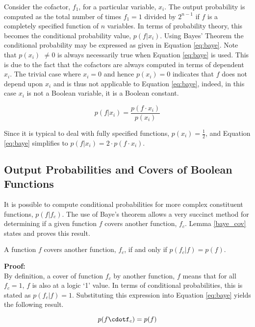 Consider the cofactor, $f_1$, for a particular variable, $x_i$.  The output probability
is computed as the total number of times $f_1 = 1$ divided by $2^{n-1}$ if $f$ is a 
completely specified function of $n$ variables.  In terms of probability theory,
this becomes the conditional probability value, $p(f | x_i)$.  Using Bayes' Theorem
the conditional probability may be expressed as given in Equation \ref{eq:baye}.
Note that $p(x_i)$ $\neq 0$ is always necessarily true when Equation \ref{eq:baye} is
used.  This is due to the fact that the cofactors are always computed in terms of dependent
$x_i$.  The trivial case where $x_i=0$ and hence $p(x_i) = 0$ indicates that $f$ does not
depend upon $x_i$ and is thus not applicable to Equation \ref{eq:baye}, indeed, in this case
$x_i$ is not a Boolean variable, it is a Boolean constant.

\begin{equation}
p(f | x_i) = \frac{p(f \cdot x_i) }{p(x_i) }   \label{eq:baye}
\end{equation}

Since it is typical to deal with fully specified functions, $p(x_i) = \frac{1}{2}$,
and Equation \ref{eq:baye} simplifies to $p(f|x_i) = 2 \cdot p(f \cdot x_i)$.

\subsection{Output Probabilities and Covers of Boolean Functions}
It is possible to compute conditional probabilities for more complex constituent
functions, $p(f|f_c)$.  The use of Baye's theorem allows a very succinct
method for determining if a given function $f$ covers another function, $f_c$.
Lemma \ref{baye_cov} states and proves this result.

\begin{lemma}   \label{baye_cov}
A function $f$ covers another function, $f_c$, if and only if
$p(f_c|f) = p(f)$.
\end{lemma}

\noindent
{\bf Proof:} \\
By definition, a cover of function $f_c$ by another function, $f$
means that for all $f_c=1$, $f$ is also at a logic `1' value.
In terms of conditional probabilities, this is stated as
$p(f_c|f) = 1$.  Substituting this expression into 
Equation \ref{eq:baye} yields the following result.

\begin{equation}
p(f\cdotf_c)=p(f)\label{eq:cover_result}
\end{equation}

